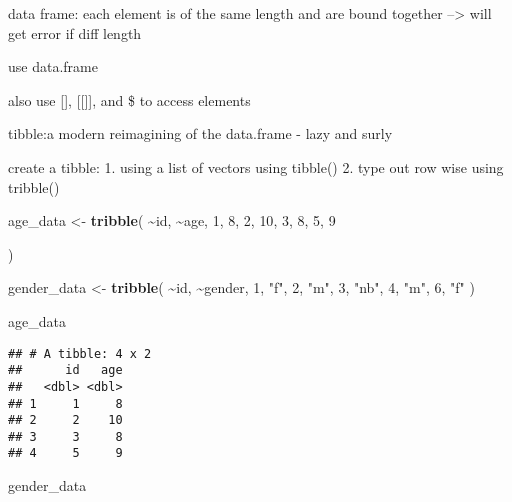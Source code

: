 \documentclass[
]{article}
\newenvironment{Shaded}{\begin{snugshade}}{\end{snugshade}}
\newcommand{\DecValTok}[1]{\textcolor[rgb]{0.00,0.00,0.81}{#1}}
\newcommand{\FunctionTok}[1]{\textcolor[rgb]{0.13,0.29,0.53}{\textbf{#1}}}
\newcommand{\NormalTok}[1]{#1}
\newcommand{\OtherTok}[1]{\textcolor[rgb]{0.56,0.35,0.01}{#1}}
\newcommand{\SpecialCharTok}[1]{\textcolor[rgb]{0.81,0.36,0.00}{\textbf{#1}}}
\newcommand{\StringTok}[1]{\textcolor[rgb]{0.31,0.60,0.02}{#1}}
\begin{document}
data frame: each element is of the same length and are bound together
--\textgreater{} will get error if diff length

use data.frame

also use {[}{]}, {[}{[}{]}{]}, and \$ to access elements

tibble:a modern reimagining of the data.frame - lazy and surly

create a tibble: 1. using a list of vectors using tibble() 2. type out
row wise using tribble()

\begin{Shaded}
\begin{Highlighting}[]
\NormalTok{age\_data }\OtherTok{\textless{}{-}} \FunctionTok{tribble}\NormalTok{(}
                    \SpecialCharTok{\textasciitilde{}}\NormalTok{id, }\SpecialCharTok{\textasciitilde{}}\NormalTok{age,}
                    \DecValTok{1}\NormalTok{, }\DecValTok{8}\NormalTok{, }
                    \DecValTok{2}\NormalTok{, }\DecValTok{10}\NormalTok{, }
                    \DecValTok{3}\NormalTok{, }\DecValTok{8}\NormalTok{,}
                    \DecValTok{5}\NormalTok{, }\DecValTok{9}
  
\NormalTok{)}

\NormalTok{gender\_data }\OtherTok{\textless{}{-}} \FunctionTok{tribble}\NormalTok{(}
                        \SpecialCharTok{\textasciitilde{}}\NormalTok{id, }\SpecialCharTok{\textasciitilde{}}\NormalTok{gender,}
                        \DecValTok{1}\NormalTok{, }\StringTok{"f"}\NormalTok{,}
                        \DecValTok{2}\NormalTok{, }\StringTok{"m"}\NormalTok{,}
                        \DecValTok{3}\NormalTok{, }\StringTok{"nb"}\NormalTok{,}
                        \DecValTok{4}\NormalTok{, }\StringTok{"m"}\NormalTok{,}
                        \DecValTok{6}\NormalTok{, }\StringTok{"f"}
\NormalTok{)}

\NormalTok{age\_data}
\end{Highlighting}
\end{Shaded}

\begin{verbatim}
## # A tibble: 4 x 2
##      id   age
##   <dbl> <dbl>
## 1     1     8
## 2     2    10
## 3     3     8
## 4     5     9
\end{verbatim}

\begin{Shaded}
\begin{Highlighting}[]
\NormalTok{gender\_data}
\end{Highlighting}
\end{Shaded}
\end{document}
